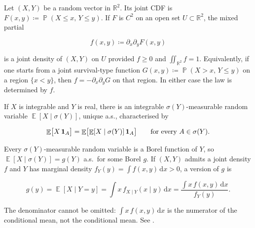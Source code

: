 \documentclass[11pt,a4paper]{article}
\DeclareMathOperator{\E}{\mathbb{E}}
\DeclareMathOperator{\Pbb}{\mathbb{P}}
\begin{document}
\begin{definition}
\label{def:joint-cdf-pdf}
Let \( (X,Y) \) be a random vector in \( \mathbb{R}^{2} \). Its joint CDF is \( F(x,y)\coloneqq\Pbb(X\le x,\,Y\le y) \). If \( F \) is \( C^{2} \) on an open set \( U\subset\mathbb{R}^{2} \), the mixed partial

\[
f(x,y)
\coloneqq
\partial_{x}\partial_{y} F(x,y)
\]

is a joint density of \( (X,Y) \) on \( U \) provided \( f\ge 0 \) and \( \iint_{\mathbb{R}^{2}}f=1 \). Equivalently, if one starts from a joint survival-type function \( G(x,y)\coloneqq\Pbb(X>x,\,Y\le y) \) on a region \( \{x<y\} \), then \( f=-\partial_{x}\partial_{y}G \) on that region. In either case the law is determined by \( f \).
\end{definition}

\begin{definition}
\label{def:cond-exp-sigma}
If \( X \) is integrable and \( Y \) is real, there is an integrable \( \sigma(Y) \)-measurable random variable \( \E[X\mid\sigma(Y)] \), unique a.s., characterised by

\[
\E\bigl[X\,\ind_{A}\bigr]
=
\E\bigl[\E[X\mid\sigma(Y)]\,\ind_{A}\bigr]
\qquad
\text{for every }A\in\sigma(Y).
\]

Every \( \sigma(Y) \)-measurable random variable is a Borel function of \( Y \), so \( \E[X\mid\sigma(Y)]=g(Y) \) a.s.\ for some Borel \( g \). If \( (X,Y) \) admits a joint density \( f \) and \( Y \) has marginal density \( f_{Y}(y)=\int f(x,y)\,\mathrm{d}x>0 \), a version of \( g \) is

\[
g(y)
=
\E[X\mid Y=y]
=
\int x\,f_{X\mid Y}(x\mid y)\,\mathrm{d}x
=
\frac{\displaystyle\int x\,f(x,y)\,\mathrm{d}x}{f_{Y}(y)}.
\]

The denominator cannot be omitted: \( \int x\,f(x,y)\,\mathrm{d}x \) is the numerator of the conditional mean, not the conditional mean. See \citep[\S4.1]{durrett2010}.
\end{definition}
\end{document}
